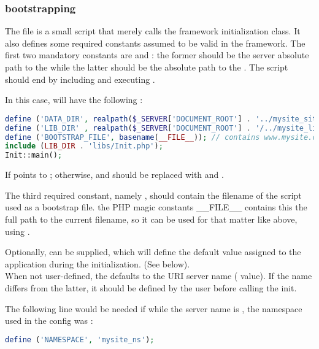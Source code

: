\documentclass[pdftex,12pt,a4paper]{article}
\begin{document}
\subsubsection{bootstrapping}

The  file is a small script that merely calls the framework initialization class. It also defines some required constants assumed to be valid in the framework.
The first two mandatory constants are  and : the former should be the server absolute path to the  while the latter should be the absolute path to the . The script should end by including  and executing .

In this case,  will have the following :
\begin{lstlisting}[label=bootstrap-code,caption=Bootstrap code sample,language=PHP]
define ('DATA_DIR', realpath($_SERVER['DOCUMENT_ROOT'] . '../mysite_site/') . '/');
define ('LIB_DIR' , realpath($_SERVER['DOCUMENT_ROOT'] . '/../mysite_lib/') . '/');
define ('BOOTSTRAP_FILE', basename(__FILE__)); // contains www.mysite.com.php
include (LIB_DIR . 'libs/Init.php');
Init::main();
\end{lstlisting}
If  points to ; otherwise,  and  should be replaced with  and .

The third required constant, namely , should contain the filename of the script used as a bootstrap file. the PHP magic constants \_\_FILE\_\_ contains this the full path to the current filename, so it can be used for that matter like above, using .

Optionally,  can be supplied, which will define the default value assigned to the application  during the initialization. (See below).\\
When not user-defined, the  defaults to the URI server name ( value). If the  name differs from the latter, it should be defined by the user before calling the  init.

The following line would be needed if while the server name is , the namespace used in the config was  :
\begin{lstlisting}[language=PHP]
define ('NAMESPACE', 'mysite_ns');
\end{lstlisting}
\end{document}
